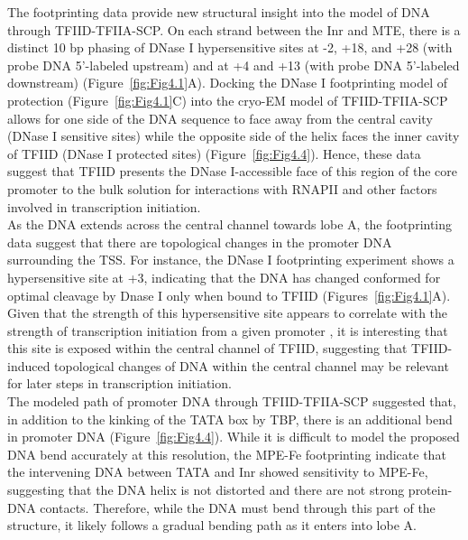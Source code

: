 \indent The footprinting data provide new structural insight into the model of DNA through TFIID-TFIIA-SCP. On each strand between the Inr and MTE, there is a distinct 10 bp phasing of DNase I hypersensitive sites at -2, +18, and +28 (with probe DNA 5’-labeled upstream) and at +4 and +13 (with probe DNA 5’-labeled downstream) (Figure~\ref{fig:Fig4.1}A).  Docking the DNase I footprinting model of protection (Figure~\ref{fig:Fig4.1}C) into the cryo-EM model of TFIID-TFIIA-SCP allows for one side of the DNA sequence to face away from the central cavity (DNase I sensitive sites) while the opposite side of the helix faces the inner cavity of TFIID (DNase I protected sites) (Figure~\ref{fig:Fig4.4}). Hence, these data suggest that TFIID presents the DNase I-accessible face of this region of the core promoter to the bulk solution for interactions with RNAPII and other factors involved in transcription initiation. \\
\indent As the DNA extends across the central channel towards lobe A, the footprinting data suggest that there are topological changes in the promoter DNA surrounding the TSS. For instance, the DNase I footprinting experiment shows a hypersensitive site at +3, indicating that the DNA has changed conformed for optimal cleavage by Dnase I only when bound to TFIID (Figures~\ref{fig:Fig4.1}A). Given that the strength of this hypersensitive site appears to correlate with the strength of transcription initiation from a given promoter \cite{Theisen_341}, it is interesting that this site is exposed within the central channel of TFIID, suggesting that TFIID-induced topological changes of DNA within the central channel may be relevant for later steps in transcription initiation. \\
\indent The modeled path of promoter DNA through TFIID-TFIIA-SCP suggested that, in addition to the kinking of the TATA box by TBP, there is an additional bend in promoter DNA (Figure~\ref{fig:Fig4.4}). While it is difficult to model the proposed DNA bend accurately at this resolution, the MPE-Fe footprinting indicate that the intervening DNA between TATA and Inr showed sensitivity to MPE-Fe, suggesting that the DNA helix is not distorted and there are not strong protein-DNA contacts. Therefore, while the DNA must bend through this part of the structure, it likely follows a gradual bending path as it enters into lobe A.\\

